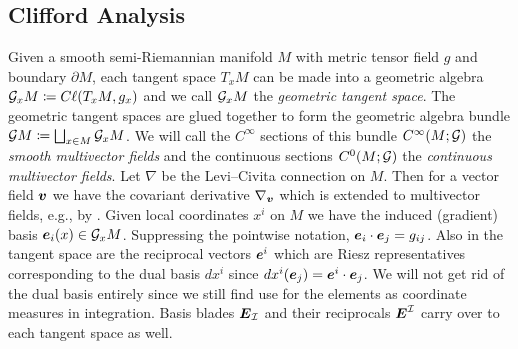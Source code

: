 \documentclass{article}
\begin{document}
\subsection{Clifford Analysis}
\label{subsec:clifford_analysis}

Given a smooth semi-Riemannian manifold $M$ with metric tensor field $g$ and boundary $\partial M$, each tangent space $T_xM$ can be made into a geometric algebra $\mathcal{G}_x M \coloneqq C\ell(T_xM,g_x)$ and we call $\mathcal{G}_xM$ the \emph{geometric tangent space}. The geometric tangent spaces are glued together to form the geometric algebra bundle $\mathcal{G} M\coloneqq \bigsqcup_{x\in M}\mathcal{G}_x M$. We will call the $C^\infty$ sections of this bundle $C^\infty(M;\mathcal{G})$ the \emph{smooth multivector fields} and the continuous sections $C^0(M;\mathcal{G})$ the \emph{continuous multivector fields}. Let $\nabla$ be the Levi--Civita connection on $M$. Then for a vector field $\boldsymbol{v}$ we have the covariant derivative $\nabla_{\boldsymbol{v}}$ which is extended to multivector fields, e.g., by \cite{schindler_geometric_2020}. Given local coordinates $x^i$ on $M$ we have the induced (gradient) basis $\boldsymbol{e}_i(x)\in \mathcal{G}_xM$. Suppressing the pointwise notation, $\boldsymbol{e}_i\cdot \boldsymbol{e}_j = g_{ij}$. Also in the tangent space are the reciprocal vectors $\boldsymbol{e}^i$ which are Riesz representatives corresponding to the dual basis $dx^i$ since $dx^i(\boldsymbol{e}_j) = \boldsymbol{e}^i \cdot \boldsymbol{e}_j$. We will not get rid of the dual basis entirely since we still find use for the elements as coordinate measures in integration. Basis blades $\boldsymbol{E}_\mathcal{I}$ and their reciprocals $\boldsymbol{E}^\mathcal{I}$ carry over to each tangent space as well.
\end{document}
